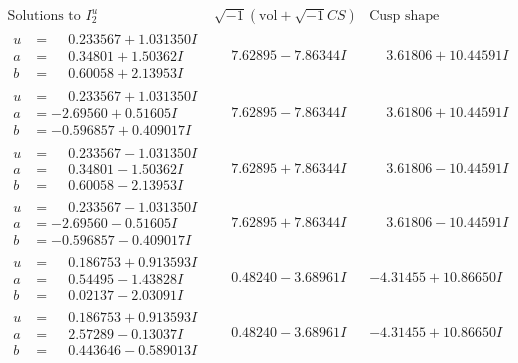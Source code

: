 \documentclass[1p]{elsarticle_modified}
\theoremstyle{definition}
\newcommand{\I}{\sqrt{-1}}
\begin{document}
$$\begin{array}{c|c|c}  
\text{Solutions to }I^u_{2}& \I (\text{vol} + \sqrt{-1}CS) & \text{Cusp shape}\\
 \hline 
\begin{aligned}
u &= \phantom{-}0.233567 + 1.031350 I \\
a &= \phantom{-}0.34801 + 1.50362 I \\
b &= \phantom{-}0.60058 + 2.13953 I\end{aligned}
 & \phantom{-}7.62895 - 7.86344 I & \phantom{-}3.61806 + 10.44591 I \\ \hline\begin{aligned}
u &= \phantom{-}0.233567 + 1.031350 I \\
a &= -2.69560 + 0.51605 I \\
b &= -0.596857 + 0.409017 I\end{aligned}
 & \phantom{-}7.62895 - 7.86344 I & \phantom{-}3.61806 + 10.44591 I \\ \hline\begin{aligned}
u &= \phantom{-}0.233567 - 1.031350 I \\
a &= \phantom{-}0.34801 - 1.50362 I \\
b &= \phantom{-}0.60058 - 2.13953 I\end{aligned}
 & \phantom{-}7.62895 + 7.86344 I & \phantom{-}3.61806 - 10.44591 I \\ \hline\begin{aligned}
u &= \phantom{-}0.233567 - 1.031350 I \\
a &= -2.69560 - 0.51605 I \\
b &= -0.596857 - 0.409017 I\end{aligned}
 & \phantom{-}7.62895 + 7.86344 I & \phantom{-}3.61806 - 10.44591 I \\ \hline\begin{aligned}
u &= \phantom{-}0.186753 + 0.913593 I \\
a &= \phantom{-}0.54495 - 1.43828 I \\
b &= \phantom{-}0.02137 - 2.03091 I\end{aligned}
 & \phantom{-}0.48240 - 3.68961 I & -4.31455 + 10.86650 I \\ \hline\begin{aligned}
u &= \phantom{-}0.186753 + 0.913593 I \\
a &= \phantom{-}2.57289 - 0.13037 I \\
b &= \phantom{-}0.443646 - 0.589013 I\end{aligned}
 & \phantom{-}0.48240 - 3.68961 I & -4.31455 + 10.86650 I \\ \hline\begin{aligned}

\end{aligned}
\end{array}$$
\end{document}
